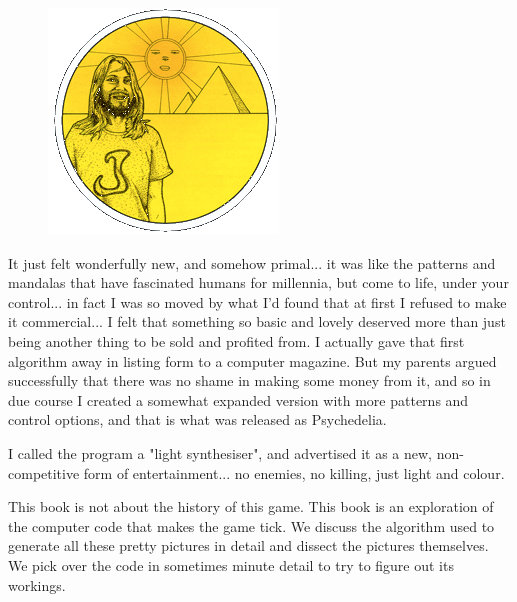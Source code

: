 \begin{definition}
\setlength{\intextsep}{0pt}%
\setlength{\columnsep}{3pt}%
\begin{figure}
\includegraphics[width=\linewidth]{src/callout/psych.png} 
\end{figure}
\small
It just felt wonderfully new, and somehow primal... it was like the patterns
  and mandalas that have fascinated humans for millennia, but come to life,
  under your control... in fact I was so moved by what I'd found that at first
  I refused to make it commercial... I felt that something so basic and lovely
  deserved more than just being another thing to be sold and profited from. I
  actually gave that first algorithm away in listing form to a computer
  magazine. But my parents argued successfully that there was no shame in
  making some money from it, and so in due course I created a somewhat expanded
  version with more patterns and control options, and that is what was released
  as Psychedelia.

  I called the program a "light synthesiser", and advertised it as a new,
  non-competitive form of entertainment... no enemies, no killing, just light
  and colour. 
\end{definition}

This book is not about the history of this game. This book is an exploration of the computer code that makes
the game tick. We discuss the algorithm used to generate all these pretty pictures in detail and dissect the
pictures themselves. We pick over the code in sometimes minute detail to try to figure out its workings.

